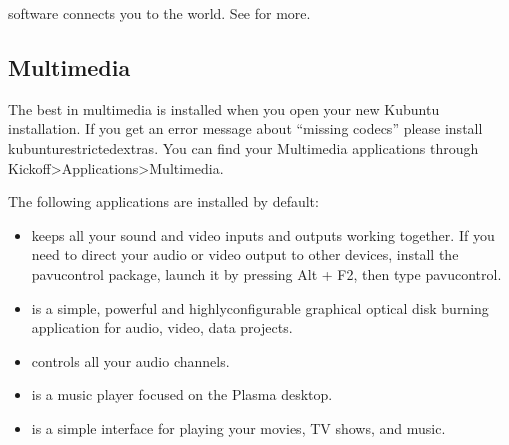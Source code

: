 \documentclass[letterpaper,10pt,english]{sphinxmanual}
\begin{document}
\sphinxAtStartPar
{} software connects you to the world. See  for more.


\subsection{Multimedia}
\label{\detokenize{docs/software-management/software:multimedia}}
\sphinxAtStartPar
The best in multimedia is installed when you open your new Kubuntu installation. If you get an error message about “missing codecs” please install kubuntu\sphinxhyphen{}restricted\sphinxhyphen{}extras. You can find your Multimedia applications through Kickoff\sphinxhyphen{}\textgreater{}Applications\sphinxhyphen{}\textgreater{}Multimedia.

\sphinxAtStartPar
The following applications are installed by default:
\begin{itemize}
\item {} 
\sphinxAtStartPar
{} keeps all your sound and video inputs and outputs working together. If you need to direct your audio or video output to other devices, install the pavucontrol package, launch it by pressing Alt + F2, then type pavucontrol.

\item {} 
\sphinxAtStartPar
{} is a simple, powerful and highly\sphinxhyphen{}configurable graphical optical disk burning application for audio, video, data projects.

\item {} 
\sphinxAtStartPar
{} controls all your audio channels.

\item {} 
\sphinxAtStartPar
{} is a music player focused on the Plasma desktop.

\item {} 
\sphinxAtStartPar
{} is a simple interface for playing your movies, TV shows, and music.

\end{itemize}
\end{document}

